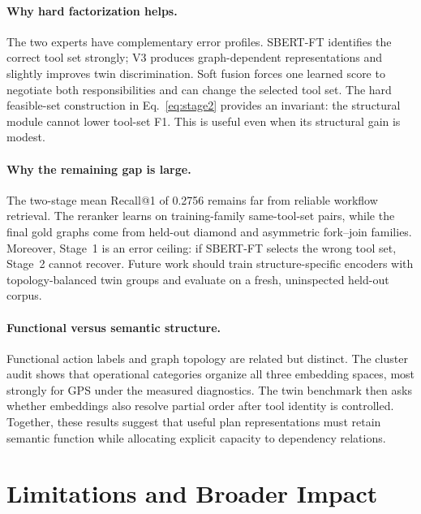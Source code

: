 \documentclass{article}
\newcommand{\sbert}{\textsc{SBERT-FT}}
\begin{document}
\paragraph{Why hard factorization helps.}
The two experts have complementary error profiles.
\sbert{} identifies the correct tool set strongly; V3 produces graph-dependent representations and slightly improves twin discrimination.
Soft fusion forces one learned score to negotiate both responsibilities and can change the selected tool set.
The hard feasible-set construction in Eq.~\ref{eq:stage2} provides an invariant: the structural module cannot lower tool-set F1.
This is useful even when its structural gain is modest.

\paragraph{Why the remaining gap is large.}
The two-stage mean Recall@1 of 0.2756 remains far from reliable workflow retrieval.
The reranker learns on training-family same-tool-set pairs, while the final gold graphs come from held-out diamond and asymmetric fork--join families.
Moreover, Stage~1 is an error ceiling: if \sbert{} selects the wrong tool set, Stage~2 cannot recover.
Future work should train structure-specific encoders with topology-balanced twin groups and evaluate on a fresh, uninspected held-out corpus.

\paragraph{Functional versus semantic structure.}
Functional action labels and graph topology are related but distinct.
The cluster audit shows that operational categories organize all three embedding spaces, most strongly for GPS under the measured diagnostics.
The twin benchmark then asks whether embeddings also resolve partial order after tool identity is controlled.
Together, these results suggest that useful plan representations must retain semantic function while allocating explicit capacity to dependency relations.

\section{Limitations and Broader Impact}
\end{document}

